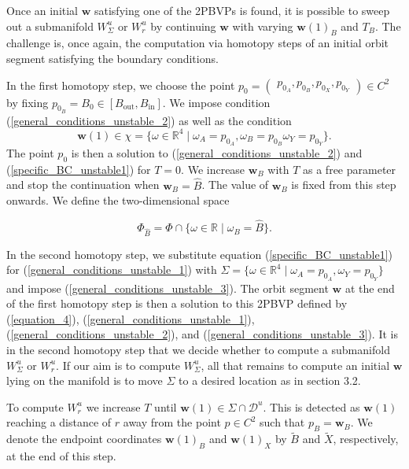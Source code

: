 \documentclass{ws-ijbc}
\begin{document}
Once an initial $\mathbf{w}$ satisfying one of the 2PBVPs  is found, it is possible to sweep out a submanifold $W^u_\Sigma$ or $W^u_r$ by continuing $\mathbf{w}$ with varying $\mathbf{w}(1)_B$ and $T_B$.  The challenge is, once again, the computation via homotopy steps of an initial orbit segment satisfying the boundary conditions.

In the first homotopy step, we choose the point $p_0=\begin{pmatrix} p_{0_A}, p_{0_B}, p_{0_X}, p_{0_Y} \end{pmatrix} \in C^2$ by fixing $p_{0_B}=B_0 \in [B_{\text{out}}, B_{\text{in}}]$.  We impose condition (\ref{general_conditions_unstable_2}) as well as the condition
	\begin{equation}
		\mathbf{w}(1) \in \chi = \{ \omega \in \mathbb{R}^4 \; | \; \omega_A=p_{0_A}, \omega_B=p_{0_B} \omega_Y=p_{0_Y} \}.
		\label{specific_BC_unstable1}
	\end{equation}
The point $p_0$ is then a solution to (\ref{general_conditions_unstable_2}) and (\ref{specific_BC_unstable1}) for $T=0$.  We increase $\mathbf{w}_B$ with $T$ as a free parameter and stop the continuation when $\mathbf{w}_B=\widehat{B}$.  The value of $\mathbf{w}_B$ is fixed from this step onwards.  We define the two-dimensional space

\begin{equation*}
	\Phi_{\widehat{B}} = \Phi \cap \{ \omega \in \mathbb{R} \; | \; \omega_B=\widehat{B}\}.
\end{equation*}

In the second homotopy step, we substitute equation (\ref{specific_BC_unstable1}) for (\ref{general_conditions_unstable_1}) with $\Sigma=\{ \omega \in \mathbb{R}^4 \;|\; \omega_A=p_{0_A}, \omega_Y=p_{0_Y} \}$ and impose (\ref{general_conditions_unstable_3}).  The orbit segment $\mathbf{w}$ at the end of the first homotopy step is then a solution to this 2PBVP defined by (\ref{equation_4}), (\ref{general_conditions_unstable_1}), (\ref{general_conditions_unstable_2}), and (\ref{general_conditions_unstable_3}).  It is in the second homotopy step that we decide whether to compute a submanifold $W^u_\Sigma$ or $W^u_r$.  If our aim is to compute $W^u_\Sigma$, all that remains to compute an initial $\mathbf{w}$ lying on the manifold is to move $\Sigma$ to a desired location as in section 3.2.

To compute $W^u_r$ we increase $T$ until $\mathbf{w}(1) \in \Sigma \cap \mathscr{D}^u$.  This is detected as $\mathbf{w}(1)$ reaching a distance of $r$ away from the point $p \in C^2$ such that $p_B = \mathbf{w}_B$.  We denote the endpoint coordinates $\mathbf{w}(1)_B$ and $\mathbf{w}(1)_X$ by $\widetilde{B}$ and $\widetilde{X}$, respectively, at the end of this step.  
\end{document}
